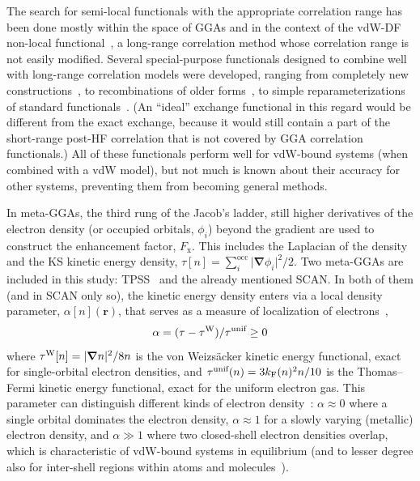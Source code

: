 The search for semi-local functionals with the appropriate correlation range has been done mostly within the space of GGAs and in the context of the vdW-DF non-local functional~\cite{DionPRL04,LeePRB10}, a long-range correlation method whose correlation range is not easily modified.
Several special-purpose functionals designed to combine well with long-range correlation models were developed, ranging from completely new constructions~\cite{PernalPRL09,WellendorffPRB12}, to recombinations of older forms~\cite{CooperPRB10,HamadaPRB14,BerlandPRB14}, to simple reparameterizations of standard functionals~\cite{ZhangPRL98,KlimesJPCM10,KlimesPRB11}.
(An ``ideal'' exchange functional in this regard would be different from the exact exchange, because it would still contain a part of the short-range post-HF correlation that is not covered by GGA correlation functionals.)
All of these functionals perform well for vdW-bound systems (when combined with a vdW model), but not much is known about their accuracy for other systems, preventing them from becoming general methods.

In meta-GGAs, the third rung of the Jacob's ladder, still higher derivatives of the electron density (or occupied orbitals, $\phi_i$) beyond the gradient are used to construct the enhancement factor, $F_\mathrm x$.
This includes the Laplacian of the density and the KS kinetic energy density, $\tau[n]=\sum_i^\text{occ}\lvert\boldsymbol\nabla\phi_i\rvert^2/2$.
Two meta-GGAs are included in this study: TPSS~\cite{TaoPRL03} and the already mentioned SCAN\@.
In both of them (and in SCAN only so), the kinetic energy density enters via a local density parameter, $\alpha[n](\mathbf r)$, that serves as a measure of localization of electrons~\cite{BeckeJCP90},
\begin{equation}
\alpha=(\tau-\tau^\text W)/\tau^\text{unif}\geq0
\end{equation}
where $\tau^\text W[n]=\lvert\boldsymbol\nabla n\rvert^2/8n$ is the von Weizsäcker kinetic energy functional, exact for single-orbital electron densities, and $\tau^\text{unif}(n)=3k_\text F(n)^2n/10$ is the Thomas--Fermi kinetic energy functional, exact for the uniform electron gas.
This parameter can distinguish different kinds of electron density~\cite{SunPRL13}: $\alpha\approx0$ where a single orbital dominates the electron density, $\alpha\approx1$ for a slowly varying (metallic) electron density, and $\alpha\gg1$ where two closed-shell electron densities overlap, which is characteristic of vdW-bound systems in equilibrium (and to lesser degree also for inter-shell regions within atoms and molecules~\cite{BeckeJCP90}).

